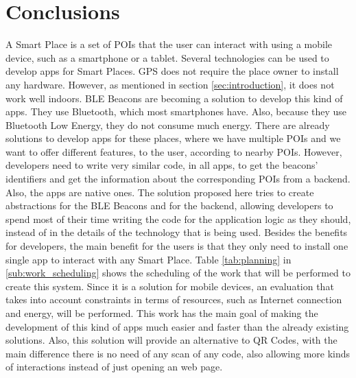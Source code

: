 
%
%

\section{Conclusions}
\label{sec:conclusions}
A Smart Place is a set of POIs that the user can interact
with using a mobile device, such as a smartphone or a tablet.
Several technologies can be used to develop apps for
Smart Places. GPS does not require the place owner to
install any hardware. However, as mentioned in 
section \ref{sec:introduction}, it does not work well
indoors. BLE Beacons are becoming a solution to
develop this kind of apps. They use Bluetooth,
which most smartphones have. Also, because they use
Bluetooth Low Energy, they do not consume much energy.
There are already solutions to develop apps for these
places, where we have multiple POIs and we want to
offer different features, to the user, according
to nearby POIs. However, developers need
to write very similar code, in all apps, to
get the beacons' identifiers and get the information
about the corresponding POIs from a backend.
Also, the apps are native ones.
The solution proposed here tries to create abstractions
for the BLE Beacons and for the backend, allowing
developers to spend most of their time writing the
code for the application logic as they should,
instead of in the details of the technology that is
being used. Besides the benefits for developers,
the main benefit for the users is that they only need
to install one single app to interact with any Smart Place.
Table \ref{tab:planning}
in \ref{sub:work_scheduling} shows the scheduling
of the work that will be performed to create this system.
Since it is a solution for mobile devices, an evaluation
that takes into account constraints in terms of resources,
such as Internet connection and energy, will be performed.
This work has the main goal of making the development
of this kind of apps much easier and faster than
the already existing solutions. Also, this solution
will provide an alternative
to QR Codes, with the main difference there is no need of
any scan of any code, also allowing more kinds of interactions
instead of just opening an web page. 
